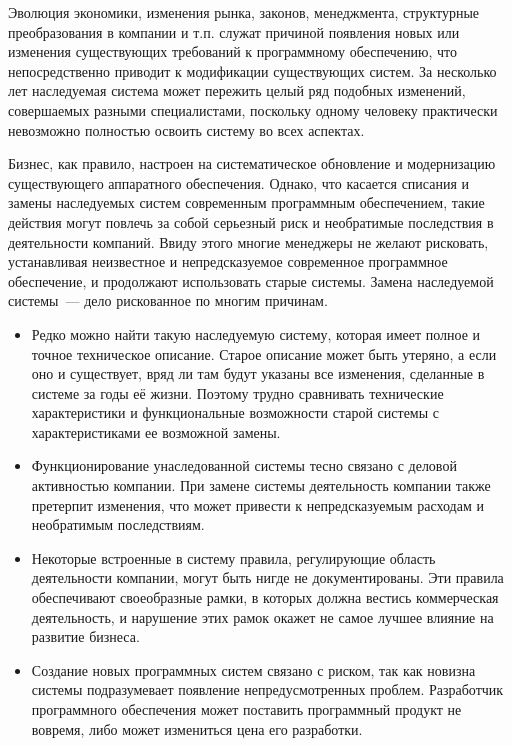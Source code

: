 \documentclass{../../text-style}
\begin{document}
Эволюция экономики, изменения рынка, законов, менеджмента, структурные преобразования в компании и т.п. служат причиной появления новых или изменения существующих требований к программному обеспечению, что непосредственно приводит к модификации существующих систем. За несколько лет наследуемая система может пережить целый ряд подобных изменений, совершаемых разными специалистами, поскольку одному человеку практически невозможно полностью освоить систему во всех аспектах.

Бизнес, как правило, настроен на систематическое обновление и модернизацию существующего аппаратного обеспечения. Однако, что касается списания и замены наследуемых систем современным программным обеспечением, такие действия могут повлечь за собой серьезный риск и необратимые последствия в деятельности компаний. Ввиду этого многие менеджеры не желают рисковать, устанавливая неизвестное и непредсказуемое современное программное обеспечение, и продолжают использовать старые системы. Замена наследуемой системы~--- дело рискованное по многим причинам.

\begin{itemize}
    \item Редко можно найти такую наследуемую систему, которая имеет полное и точное техническое описание. Старое описание может быть утеряно, а если оно и существует, вряд ли там будут указаны все изменения, сделанные в системе за годы её жизни. Поэтому трудно сравнивать технические характеристики и функциональные возможности старой системы с характеристиками ее возможной замены.
    \item Функционирование унаследованной системы тесно связано с деловой активностью компании. При замене системы деятельность компании также претерпит изменения, что может привести к непредсказуемым расходам и необратимым последствиям.
    \item Некоторые встроенные в систему правила, регулирующие область деятельности компании, могут быть нигде не документированы. Эти правила обеспечивают своеобразные рамки, в которых должна вестись коммерческая деятельность, и нарушение этих рамок окажет не самое лучшее влияние на развитие бизнеса. 
    \item Создание новых программных систем связано с риском, так как новизна системы подразумевает появление непредусмотренных проблем. Разработчик программного обеспечения может поставить программный продукт не вовремя, либо может измениться цена его разработки.
\end{itemize}
\end{document}
